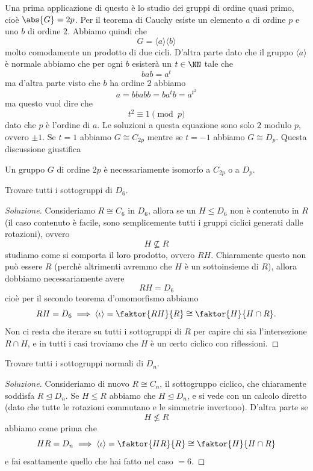 \documentclass[11pt]{scrartcl}
\newcommand{\normal}{\mathrel{\unlhd}}
\begin{document}
	 Una prima applicazione di questo è lo studio dei gruppi di ordine quasi primo, cioè $\abs{G}=2p$. Per il teorema di Cauchy esiste un elemento $a$ di ordine $p$ e uno $b$ di ordine $2$. Abbiamo quindi che 
	 $$G=\langle a\rangle \langle b \rangle$$
	 molto comodamente un prodotto di due cicli. D'altra parte dato che il gruppo $\langle a \rangle$ è normale abbiamo che per ogni $b$ esisterà un $t\in \NN$ tale che
	 $$bab=a^t$$
	 ma d'altra parte visto che $b$ ha ordine $2$ abbiamo
	 $$a=bbabb=ba^tb=a^{t^2}$$
	 ma questo vuol dire che 
	 $$t^2\equiv 1 \pmod{p}$$
	 dato che $p$ è l'ordine di $a$. Le soluzioni a questa equazione sono solo $2$ modulo $p$, ovvero $\pm 1$. Se $t=1$ abbiamo $G\cong C_{2p}$ mentre se $t=-1$ abbiamo $G\cong D_p$. Questa discussione giustifica
	 \begin{proposition}
	 	Un gruppo $G$ di ordine $2p$ è necessariamente isomorfo a $C_{2p}$ o a $D_p$.
	 \end{proposition} 
	 \begin{exercise}
	 	Trovare tutti i sottogruppi di $D_6$.
	 \end{exercise}
	 \begin{proof}[Soluzione]
	 	Consideriamo $R\cong C_6$ in $D_6$, allora se un $H\le D_6$ non è contenuto in $R$ (il caso contenuto è facile, sono semplicemente tutti i gruppi ciclici generati dalle rotazioni), ovvero
	 	$$H\not \subseteq R$$
	 	studiamo come si comporta il loro prodotto, ovvero $RH$. Chiaramente questo non può essere $R$ (perchè altrimenti avremmo che $H$ è un sottoinsieme di $R$), allora dobbiamo necessariamente avere
	 	$$RH=D_6$$
	 	cioè per il secondo teorema d'omomorfismo abbiamo
	 	$$RH=D_6\implies \langle \iota \rangle=\faktor{RH}{R}\cong \faktor{H}{H\cap R}.$$
	 	Non ci resta che iterare su tutti i sottogruppi di $R$ per capire chi sia l'intersezione $R\cap H$, e in tutti i casi troviamo che $H$ è un certo ciclico con riflessioni.
	 \end{proof}
	 \begin{exercise}
	 	Trovare tutti i sottogruppi normali di $D_n$.
	 \end{exercise}
	 \begin{proof}[Soluzione]
	 	Consideriamo di nuovo $R\cong C_n$, il sottogruppo ciclico, che chiaramente soddisfa $R\normal D_n$. Se $H\le R$ abbiamo che $H\normal D_n$, e si vede con un calcolo diretto (dato che tutte le rotazioni commutano e le simmetrie invertono).  D'altra parte se 
	 	$$H\not\le R$$
	 	abbiamo come prima che
	 	$$HR=D_n \implies \langle \iota \rangle = \faktor{HR}{R}\cong \faktor{H}{H\cap R}$$
	 	e fai esattamente quello che hai fatto nel caso $=6$.
	 \end{proof}
	 
\end{document}
